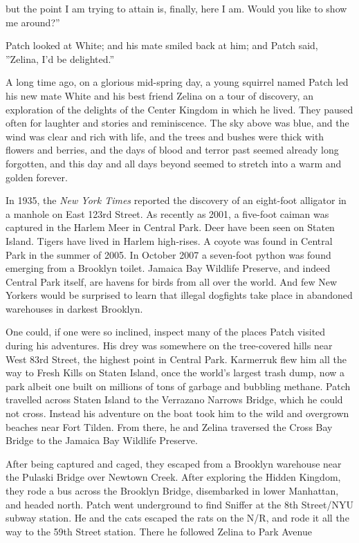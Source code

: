 \documentclass[11pt]{article}
\begin{document}
 but the point I am trying to attain is, finally, here I am. Would you like to show me around?''\par
 Patch looked at White; and his mate smiled back at him; and Patch said, ''Zelina, I'd be delighted.''\par
 A long time ago, on a glorious mid-spring day, a young squirrel named Patch led his new mate White and his best friend Zelina on a tour of discovery, an exploration of the delights of the Center Kingdom in which he lived. They paused often for laughter and stories and reminiscence. The sky above was blue, and the wind was clear and rich with life, and the trees and bushes were thick with flowers and berries, and the days of blood and terror past seemed already long forgotten, and this day and all days beyond seemed to stretch into a warm and golden forever. \par
{}\par
In 1935, the {\it New York Times} reported the discovery of an eight-foot alligator in a manhole on East 123rd Street. As recently as 2001, a five-foot caiman was captured in the Harlem Meer in Central Park. Deer have been seen on Staten Island. Tigers have lived in Harlem high-rises. A coyote was found in Central Park in the summer of 2005. In October 2007 a seven-foot python was found emerging from a Brooklyn toilet. Jamaica Bay Wildlife Preserve, and indeed Central Park itself, are havens for birds from all over the world. And few New Yorkers would be surprised to learn that illegal dogfights take place in abandoned warehouses in darkest Brooklyn.\par
One could, if one were so inclined, inspect many of the places Patch visited during his adventures. His drey was somewhere on the tree-covered hills near West 83rd Street, the highest point in Central Park. Karmerruk flew him all the way to Fresh Kills on Staten Island, once the world's largest trash dump, now a park %
 albeit one built on millions of tons of garbage and bubbling methane. Patch travelled across Staten Island to the Verrazano Narrows Bridge, which he could not cross. Instead his adventure on the boat took him to the wild and overgrown beaches near Fort Tilden. From there, he and Zelina traversed the Cross Bay Bridge to the Jamaica Bay Wildlife Preserve.\par
After being captured and caged, they escaped from a Brooklyn warehouse near the Pulaski Bridge over Newtown Creek. After exploring the Hidden Kingdom, they rode a bus across the Brooklyn Bridge, disembarked in lower Manhattan, and headed north. Patch went underground to find Sniffer at the 8th Street/NYU subway station. He and the cats escaped the rats on the N/R, and rode it all the way to the 59th Street station. There he followed Zelina to Park Avenue %
\end{document}
